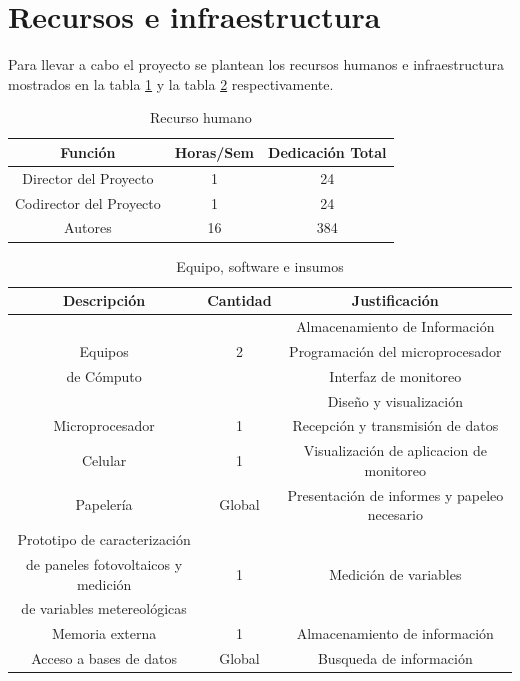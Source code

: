 \section{Recursos e infraestructura}

Para llevar a cabo el proyecto se plantean los recursos humanos e infraestructura mostrados en la tabla \ref{tab:Recurso-humano} y la tabla \ref{tab:Resumen-costos-equipo} respectivamente. 

\begin{table}[ht]
\caption{\label{tab:Recurso-humano} Recurso humano}
\begin{centering}
\begin{tabular}{|c||c||c|}
\hline 
Función  & Horas/Sem & Dedicación Total
\tabularnewline
\hline
\hline 
Director del Proyecto & 1 & 24 \tabularnewline %
\hline 
\hline
Codirector del Proyecto & 1 & 24 \tabularnewline %
\hline 
\hline
Autores & 16  & 384 \tabularnewline %
\hline
\hline
\end{tabular}
\par \end{centering}
\end{table}

\begin{table}[ht]
\caption{\label{tab:Resumen-costos-equipo} Equipo, software e insumos}
\begin{centering}
\begin{tabular}{|c||c||c|}
\hline 
\textbf{Descripción} & \textbf{Cantidad} & \textbf{Justificación} \tabularnewline
\hline
\hline 
 &  &  Almacenamiento de Información\tabularnewline
Equipos  & 2 & Programación del microprocesador \tabularnewline
 de Cómputo &  & Interfaz de monitoreo \tabularnewline & & Diseño y visualización   \tabularnewline
 \hline
 \hline
Microprocesador  & 1 & Recepción y transmisión de datos   \tabularnewline
\hline  
\hline
Celular  & 1 &  Visualización de aplicacion de monitoreo\tabularnewline
\hline 
\hline
Papelería & Global & Presentación de informes y papeleo necesario  \tabularnewline 
\hline 
\hline
Prototipo de caracterización &  &  \tabularnewline 
de paneles fotovoltaicos y medición & 1 & Medición de variables \tabularnewline 
de variables metereológicas & & \tabularnewline 
\hline
\hline
Memoria externa  & 1 & Almacenamiento de información\tabularnewline
\hline
\hline
Acceso a bases de datos & Global & Busqueda de información \tabularnewline
\hline
\hline
\end{tabular}
\par\end{centering}
\end{table}


